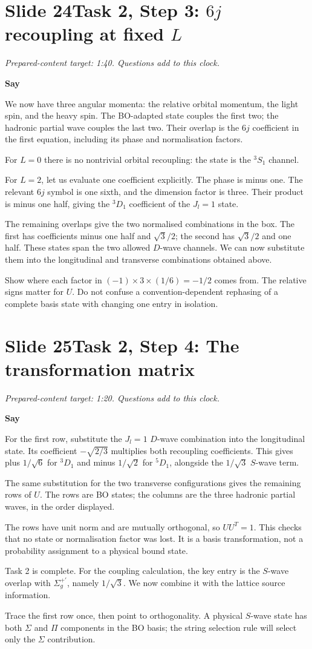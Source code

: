 \documentclass[11pt,a4paper]{article}
\newcommand{\Sigmap}{\Sigma_g^{+\prime}}
\newcommand{\cue}[1]{\begin{private}#1\end{private}}
\newenvironment{speech}{\par\textbf{Say}\par}{\par}
\newcommand{\slidenote}[3]{%
  \clearpage
  \pdfbookmark[1]{Slide #1}{slide-#1}%
  \section*{Slide #1\quad #2}
  \textit{Prepared-content target: #3. Questions add to this clock.}\par
}
\begin{document}
\slidenote{24}{Task 2, Step 3: $6j$ recoupling at fixed $L$}{1:40}
\begin{speech}
We now have three angular momenta: the relative orbital momentum,
the light spin, and the heavy spin. The BO-adapted state couples the
first two; the hadronic partial wave couples the last two. Their
overlap is the $6j$ coefficient in the first equation, including its
phase and normalisation factors.

For $L=0$ there is no nontrivial orbital recoupling: the state is
the ${}^3S_1$ channel.

For $L=2$, let us evaluate one coefficient explicitly. The phase is
minus one. The relevant $6j$ symbol is one sixth, and the dimension
factor is three. Their product is minus one half, giving the
${}^3D_1$ coefficient of the $J_l=1$ state.

The remaining overlaps give the two normalised combinations in the
box. The first has coefficients minus one half and $\sqrt3/2$;
the second has $\sqrt3/2$ and one half. These states span the two
allowed $D$-wave channels. We can now substitute them into the
longitudinal and transverse combinations obtained above.
\end{speech}
\cue{Show where each factor in $(-1)\times3\times(1/6)=-1/2$ comes from.
The relative signs matter for $U$. Do not confuse a convention-dependent
rephasing of a complete basis state with changing one entry in isolation.}

\slidenote{25}{Task 2, Step 4: The transformation matrix}{1:20}
\begin{speech}
For the first row, substitute the $J_l=1$ $D$-wave combination into
the longitudinal state. Its coefficient $-\sqrt{2/3}$ multiplies
both recoupling coefficients. This gives plus $1/\sqrt6$ for
${}^3D_1$ and minus $1/\sqrt2$ for ${}^5D_1$, alongside the
$1/\sqrt3$ $S$-wave term.

The same substitution for the two transverse configurations gives
the remaining rows of $U$. The rows are BO states; the columns are
the three hadronic partial waves, in the order displayed.

The rows have unit norm and are mutually orthogonal, so $UU^T=1$.
This checks that no state or normalisation factor was lost. It is
a basis transformation, not a probability assignment to a physical
bound state.

Task 2 is complete. For the coupling calculation, the key entry is
the $S$-wave overlap with $\Sigmap$, namely $1/\sqrt3$.
We now combine it with the lattice source information.
\end{speech}
\cue{Trace the first row once, then point to orthogonality. A physical
$S$-wave state has both $\Sigma$ and $\Pi$ components in the BO basis;
the string selection rule will select only the $\Sigma$ contribution.}
\end{document}
